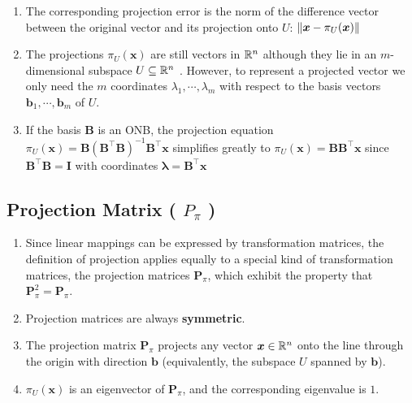 \begin{enumerate}
    \item
    \begin{definition}
        The corresponding projection error is the norm of the difference vector between the original vector and its projection onto $U$:
        $
            \left\| \bm{x} - \pi_U(\bm{x}) \right\|
        $
        \hfill \cite{mfml/book/mml/Deisenroth-Faisal-Ong}
    \end{definition}

    \item The projections $\pi_U (\bm{x})$ are still vectors in $\mathbb{R}^n$ although they lie in an $m$-dimensional subspace $U \subseteq \mathbb{R}^n$ .
    However, to represent a projected vector we only need the $m$ coordinates $\lambda_1, \cdots , \lambda_m$ with respect to the basis vectors $\bm{b}_1, \cdots , \bm{b}_m$ of $U$.
    \hfill \cite{mfml/book/mml/Deisenroth-Faisal-Ong}

    \item If the basis $\bm{B}$ is an ONB, the projection equation
    $
        \pi_U (\bm{x})
        = \bm{B} (\bm{B}^\top \bm{B})^{-1} \bm{B}^\top \bm{x}
    $
    simplifies greatly to $ \pi_U (\bm{x}) = \bm{B}\bm{B}^\top \bm{x}$ since $\bm{B}^\top \bm{B} = \bm{I}$ with coordinates $\bm{\lambda} = \bm{B}^\top \bm{x} $
\end{enumerate}



\subsection{Projection Matrix ( $P_\pi$ )}

\begin{enumerate}
    \item Since linear mappings can be expressed by transformation matrices, the definition of projection applies equally to a special kind  of transformation matrices, the projection matrices $\bm{P}_\pi$, which exhibit the property that $\bm{P}^2_\pi = \bm{P}_\pi$.
    \hfill \cite{mfml/book/mml/Deisenroth-Faisal-Ong}

    \item Projection matrices are always \textbf{symmetric}.
    \hfill \cite{mfml/book/mml/Deisenroth-Faisal-Ong}

    \item The projection matrix $\bm{P}_ \pi$ projects any vector $\bm{x} \in \mathbb{R}^n$ onto the line through the origin with direction $\bm{b}$ (equivalently, the subspace $U$ spanned by $\bm{b}$).
    \hfill \cite{mfml/book/mml/Deisenroth-Faisal-Ong}

    \item $\pi_U (\bm{x})$ is an eigenvector of $\bm{P}_\pi$, and the corresponding eigenvalue is $1$.
    \hfill \cite{mfml/book/mml/Deisenroth-Faisal-Ong}
\end{enumerate}



